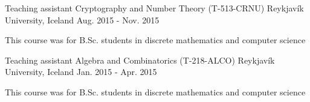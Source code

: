 \begin{cventries}
  \cventry
    {Teaching assistant} %
    {Cryptography and Number Theory (T-513-CRNU)} %
    {Reykjavík University, Iceland} %
    {Aug. 2015 - Nov. 2015} %
    {
      \begin{cvitems} %
        \item {This course was for B.Sc. students in discrete mathematics and computer science}
      \end{cvitems}
    }


\cventry
  {Teaching assistant} %
  {Algebra and Combinatorics (T-218-ALCO)} %
  {Reykjavík University, Iceland} %
  {Jan. 2015 - Apr. 2015} %
  {
    \begin{cvitems} %
      \item {This course was for B.Sc. students in discrete mathematics and computer science}
    \end{cvitems}
  }


\end{cventries}
